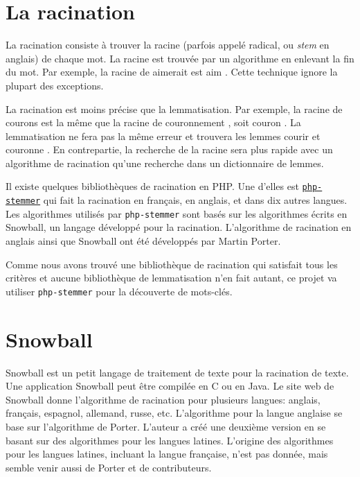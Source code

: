 \section{La racination}

La racination consiste à trouver la racine (parfois appelé radical, ou \emph{stem} en anglais) de chaque mot.
La racine est trouvée par un algorithme en enlevant la fin du mot.
Par exemple, la racine de \og aimerait \fg{} est \og aim \fg{}.
Cette technique ignore la plupart des exceptions.

La racination est moins précise que la lemmatisation.
Par exemple, la racine de \og courons \fg{} est la même que la racine de \og couronnement \fg{}, soit \og couron \fg{}.
La lemmatisation ne fera pas la même erreur et trouvera les lemmes \og courir \fg{} et \og couronne \fg{}.
En contrepartie, la recherche de la racine sera plus rapide avec un algorithme de racination qu'une recherche dans un dictionnaire de lemmes.

Il existe quelques biblioth\`eques de racination en PHP.
Une d'elles est \href{https://github.com/wamania/php-stemmer}{\texttt{php-stemmer}} qui fait la racination en français, en anglais, et dans dix autres langues.
Les algorithmes utilisés par \texttt{php-stemmer} sont basés sur les algorithmes écrits en Snowball, un langage développé pour la racination.
L'algorithme de racination en anglais ainsi que Snowball ont été développés par Martin Porter.


Comme nous avons trouvé une biblioth\`eque de racination qui satisfait tous les critères et aucune biblioth\`eque de lemmatisation n'en fait autant, ce projet va utiliser \texttt{php-stemmer} pour la découverte de mots-clés.

\section{Snowball}

Snowball est un petit langage de traitement de texte pour la racination de texte.
Une application Snowball peut être compilée en C ou en Java.
Le site web de Snowball donne l'algorithme de racination pour plusieurs langues: anglais, français, espagnol, allemand, russe, etc.
L'algorithme pour la langue anglaise se base sur l'algorithme de Porter.
%
%
L'auteur a créé une deuxième version en se basant sur des algorithmes pour les langues latines.
L'origine des algorithmes pour les langues latines, incluant la langue française, n'est pas donnée, mais semble venir aussi de Porter et de contributeurs.

